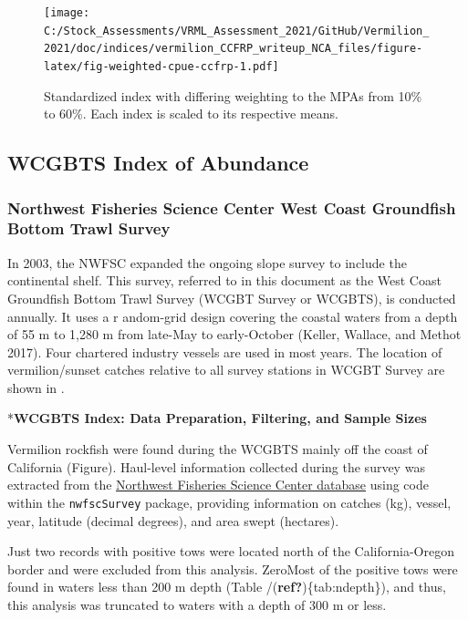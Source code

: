 \documentclass[
  english,
  a4paper,
]{article}
\begin{document}
\begin{figure}
\centering
\texttt{[image: C:/Stock\_Assessments/VRML\_Assessment\_2021/GitHub/Vermilion\_2021/doc/indices/vermilion\_CCFRP\_writeup\_NCA\_files/figure-latex/fig-weighted-cpue-ccfrp-1.pdf]}
\caption{\label{fig:fig-weighted-cpue-ccfrp}Standardized index with differing weighting to the MPAs from 10\% to 60\%. Each index is scaled to its respective means.}
\end{figure}

\clearpage

\hypertarget{wcgbts-index-of-abundance}{%
\subsection{WCGBTS Index of Abundance}\label{wcgbts-index-of-abundance}}

\hypertarget{northwest-fisheries-science-center-west-coast-groundfish-bottom-trawl-survey}{%
\subsubsection{Northwest Fisheries Science Center West Coast Groundfish Bottom Trawl Survey}\label{northwest-fisheries-science-center-west-coast-groundfish-bottom-trawl-survey}}

In 2003, the NWFSC expanded the ongoing slope survey to include the continental
shelf. This survey, referred to in this document as the West Coast Groundfish
Bottom Trawl Survey (WCGBT Survey or WCGBTS), is conducted annually. It uses a r
andom-grid design covering the coastal waters from a depth of 55 m to 1,280 m
from late-May to early-October (Keller, Wallace, and Methot 2017). Four chartered industry vessels
are used in most years. The location of vermilion/sunset catches relative to all
survey stations in WCGBT Survey are shown in .

*\textbf{WCGBTS Index: Data Preparation, Filtering, and Sample Sizes}

Vermilion rockfish were found during the WCGBTS mainly off the coast of
California (Figure). Haul-level information collected during the
survey was extracted from the
\href{https://www.webapps.nwfsc.noaa.gov/data}{Northwest Fisheries Science Center database}
using code within the \texttt{nwfscSurvey} package, providing information on
catches (kg),
vessel,
year,
latitude (decimal degrees), and
area swept (hectares).

Just
two
records with positive tows were located north of the California-Oregon border
and were excluded from this analysis.
ZeroMost of the positive tows were found in waters less than 200 m depth
(Table /(\textbf{ref?})\{tab:ndepth\}), and thus,
this analysis was truncated to waters with a depth of 300 m or less.
\end{document}
